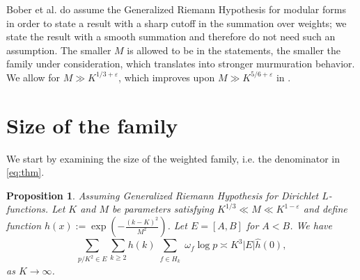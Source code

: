 \documentclass[reqno, 12pt]{amsart}
\newtheorem{prop}{Proposition}
\begin{document}
Bober et al. \cite{bober_murmurations_2023} do assume the Generalized Riemann Hypothesis for modular forms in order to state a result with a sharp cutoff in the summation over weights; we state the result with a smooth summation and therefore do not need such an assumption. The smaller $M$ is allowed to be in the statements, the smaller the family under consideration, which translates into stronger murmuration behavior. We allow for $M \gg K^{1/3+\varepsilon}$, which improves upon $M \gg K^{5/6+\varepsilon}$ in \cite{bober_murmurations_2023}.

\section{Size of the family}

We start by examining the size of the weighted family, i.e. the denominator in \eqref{eq:thm}.
\begin{prop}
\label{prop:family-size}
{Assuming Generalized Riemann Hypothesis for Dirichlet $L$-functions. Let $K$ and $M$ be parameters satisfying $K^{1/3} \ll M \ll K^{1-\varepsilon}$ and define function $h(x) := \exp(-\tfrac{(k-K)^2}{M^2})$.} Let $E = [A,B]$ for $A < B$. We have
\begin{equation}
\label{eq:family-size}
\displaystyle\sum_{p/K^2\in E} \sum_{k \geqslant 2} h(k) \sum_{\substack{f \in H_k}} \omega_f  \log p \asymp  K^3 |E| \hat{h}(0),
\end{equation}
as $K \to \infty$.
\end{prop}
\end{document}
